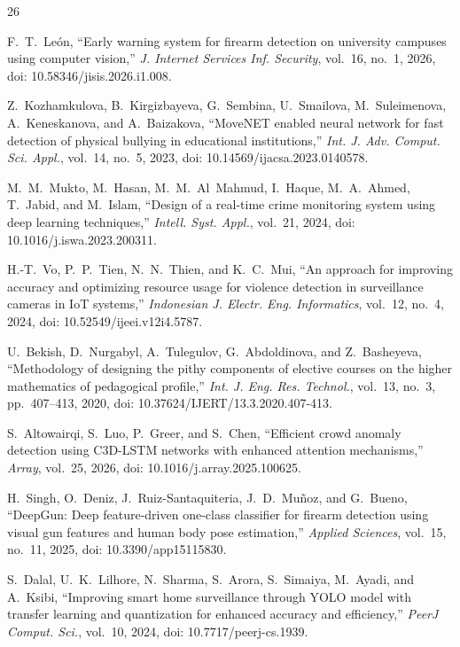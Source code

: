 \documentclass[conference]{IEEEtran}
\begin{document}
\begin{thebibliography}{26}
\renewcommand{\bibfont}{\scriptsize}

 F.~T.~Le\'{o}n, ``Early warning system for firearm detection on university campuses using computer vision,'' \textit{J. Internet Services Inf. Security}, vol.~16, no.~1, 2026, doi: 10.58346/jisis.2026.i1.008.

 Z.~Kozhamkulova, B.~Kirgizbayeva, G.~Sembina, U.~Smailova, M.~Suleimenova, A.~Keneskanova, and A.~Baizakova, ``MoveNET enabled neural network for fast detection of physical bullying in educational institutions,'' \textit{Int. J. Adv. Comput. Sci. Appl.}, vol.~14, no.~5, 2023, doi: 10.14569/ijacsa.2023.0140578.

 M.~M.~Mukto, M.~Hasan, M.~M.~Al~Mahmud, I.~Haque, M.~A.~Ahmed, T.~Jabid, and M.~Islam, ``Design of a real-time crime monitoring system using deep learning techniques,'' \textit{Intell. Syst. Appl.}, vol.~21, 2024, doi: 10.1016/j.iswa.2023.200311.

 H.-T.~Vo, P.~P.~Tien, N.~N.~Thien, and K.~C.~Mui, ``An approach for improving accuracy and optimizing resource usage for violence detection in surveillance cameras in IoT systems,'' \textit{Indonesian J. Electr. Eng. Informatics}, vol.~12, no.~4, 2024, doi: 10.52549/ijeei.v12i4.5787.

 U.~Bekish, D.~Nurgabyl, A.~Tulegulov, G.~Abdoldinova, and Z.~Basheyeva, ``Methodology of designing the pithy components of elective courses on the higher mathematics of pedagogical profile,'' \textit{Int. J. Eng. Res. Technol.}, vol.~13, no.~3, pp.~407--413, 2020, doi: 10.37624/IJERT/13.3.2020.407-413.

 S.~Altowairqi, S.~Luo, P.~Greer, and S.~Chen, ``Efficient crowd anomaly detection using C3D-LSTM networks with enhanced attention mechanisms,'' \textit{Array}, vol.~25, 2026, doi: 10.1016/j.array.2025.100625.

 H.~Singh, O.~Deniz, J.~Ruiz-Santaquiteria, J.~D.~Mu\~{n}oz, and G.~Bueno, ``DeepGun: Deep feature-driven one-class classifier for firearm detection using visual gun features and human body pose estimation,'' \textit{Applied Sciences}, vol.~15, no.~11, 2025, doi: 10.3390/app15115830.

 S.~Dalal, U.~K.~Lilhore, N.~Sharma, S.~Arora, S.~Simaiya, M.~Ayadi, and A.~Ksibi, ``Improving smart home surveillance through YOLO model with transfer learning and quantization for enhanced accuracy and efficiency,'' \textit{PeerJ Comput. Sci.}, vol.~10, 2024, doi: 10.7717/peerj-cs.1939.


\end{thebibliography}
\end{document}
